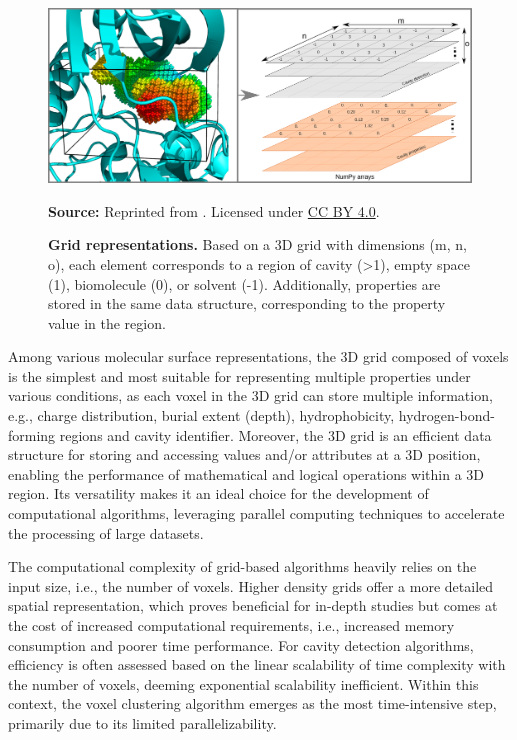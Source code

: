 \documentclass[Ingles]{phdthesis}
\def\ie{i.e.\onedot}
\def\eg{e.g.\onedot}
\begin{document}
\begin{figure}[h]
  \centerline{\includegraphics[scale=1]{images/voxels.png}}
  \centerline{\tiny{\textbf{Source:} Reprinted from \cite{guerra2021}. Licensed under \href{https://creativecommons.org/licenses/by/4.0/}{CC BY 4.0}.}}
  \caption[Grid representations]{\textbf{Grid representations.} Based on a 3D grid with dimensions (m, n, o), each element corresponds to a region of cavity (>1), empty space (1), biomolecule (0), or solvent (-1). Additionally, properties are stored in the same data structure, corresponding to the property value in the region.}
  \label{fig:voxel}
\end{figure}

Among various molecular surface representations, the 3D grid composed of voxels is the simplest and most suitable for representing multiple properties under various conditions, as each voxel in the 3D grid can store multiple information, \eg, charge distribution, burial extent (depth), hydrophobicity, hydrogen-bond-forming regions and cavity identifier. Moreover, the 3D grid is an efficient data structure for storing and accessing values and/or attributes at a 3D position, enabling the performance of mathematical and logical operations within a 3D region. Its versatility makes it an ideal choice for the development of computational algorithms, leveraging parallel computing techniques to accelerate the processing of large datasets.

The computational complexity of grid-based algorithms heavily relies on the input size, \ie, the number of voxels. Higher density grids offer a more detailed spatial representation, which proves beneficial for in-depth studies but comes at the cost of increased computational requirements, \ie, increased memory consumption and poorer time performance. For cavity detection algorithms, efficiency is often assessed based on the linear scalability of time complexity with the number of voxels, deeming exponential scalability inefficient. Within this context, the voxel clustering algorithm emerges as the most time-intensive step, primarily due to its limited parallelizability. 
\end{document}
